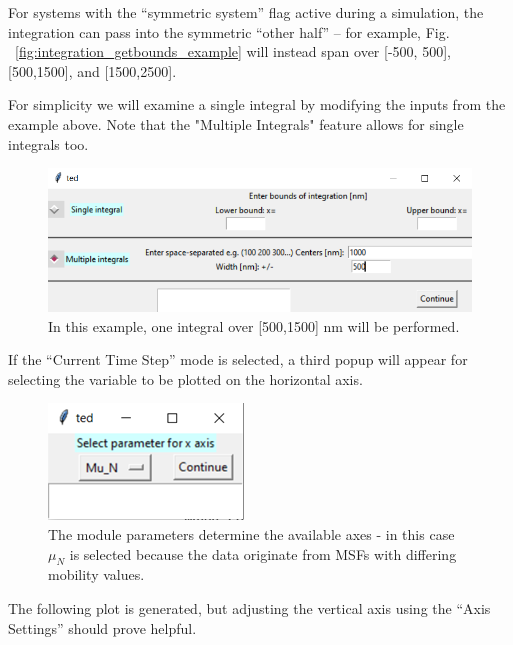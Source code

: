 \documentclass[11pt,letterpaper,titlepage]{article}
\begin{document}
		\par For systems with the “symmetric system” flag active during a simulation, the integration can pass into the symmetric “other half” – for example, Fig. ~\ref{fig:integration_getbounds_example} will instead span over [-500, 500], [500,1500], and [1500,2500].
		
		\par For simplicity we will examine a single integral by modifying the inputs from the example above. Note that the "Multiple Integrals" feature allows for single integrals too.
		
		\begin{figure}[H]
			\label{fig:integration_getbounds_example2}
			\centering
			\includegraphics[scale=0.77]{"integration_getbounds_example2"}
			\caption{In this example, one integral over [500,1500] nm will be performed.}
			
		\end{figure}
	
		\par If the “Current Time Step” mode is selected, a third popup will appear for selecting the variable to be plotted on the horizontal axis.
		
		\begin{figure}[H]
			\label{fig:integration_xaxis_example}
			\centering
			\includegraphics{"integration_xaxis_example"}
			\caption{The module parameters determine the available axes - in this case $\mu_{N}$ is selected because the data originate from MSFs with differing mobility values.}
		\end{figure}
	
		\par The following plot is generated, but adjusting the vertical axis using the “Axis Settings” should prove helpful.
		
\end{document}
